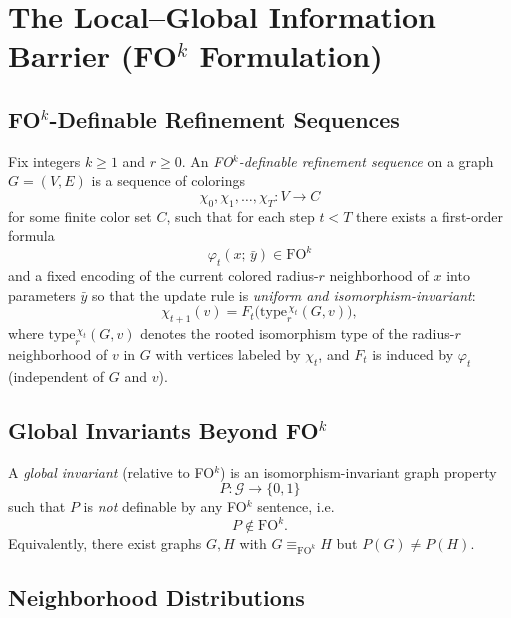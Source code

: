 
\section{The Local--Global Information Barrier (FO$^k$ Formulation)}

\subsection{FO$^k$-Definable Refinement Sequences}

\begin{definition}
Fix integers $k\ge 1$ and $r\ge 0$. An \emph{FO$^k$-definable refinement sequence} on a graph $G=(V,E)$
is a sequence of colorings
\[
\chi_0,\chi_1,\dots,\chi_T : V \to C
\]
for some finite color set $C$, such that for each step $t<T$ there exists a first-order formula
\[
\varphi_t(x;\, \bar y) \in \mathrm{FO}^k
\]
and a fixed encoding of the current colored radius-$r$ neighborhood of $x$ into parameters $\bar y$
so that the update rule is \emph{uniform and isomorphism-invariant}:
\[
\chi_{t+1}(v) = F_t\big(\mathrm{type}^{\,\chi_t}_{r}(G,v)\big),
\]
where $\mathrm{type}^{\,\chi_t}_{r}(G,v)$ denotes the rooted isomorphism type of the radius-$r$
neighborhood of $v$ in $G$ with vertices labeled by $\chi_t$, and $F_t$ is induced by $\varphi_t$
(independent of $G$ and $v$).
\end{definition}

\subsection{Global Invariants Beyond FO$^k$}

\begin{definition}
A \emph{global invariant} (relative to FO$^k$) is an isomorphism-invariant graph property
\[
P:\mathcal{G}\to\{0,1\}
\]
such that $P$ is \emph{not} definable by any FO$^k$ sentence, i.e.
\[
P \notin \mathrm{FO}^k.
\]
Equivalently, there exist graphs $G,H$ with $G \equiv_{\mathrm{FO}^k} H$ but $P(G)\ne P(H)$.
\end{definition}

\subsection{Neighborhood Distributions}

